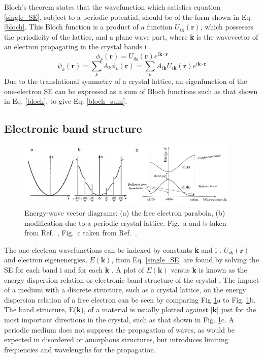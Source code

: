 \documentclass[11pt, twoside]{report}
\begin{document}
Bloch's theorem states that the wavefunction which satisfies equation \ref{single_SE}, subject to a periodic potential, should be of the form shown in Eq. \ref{bloch}. This Bloch function is a product of a function $U_{i\mathbf{k}}(\mathbf{r})$, which possesses the periodicity of the lattice, and a plane wave part, where \textbf{k} is the wavevector of an electron propagating in the crystal bands i \cite{Nelson3}.
\begin{equation} \label{bloch}
\phi_k(\mathbf{r}) = U_{i\mathbf{k}}(\mathbf{r}) e^{i\mathbf{k \cdot r}} 
\end{equation}
\begin{equation} \label{bloch_sum}
\psi_k(\mathbf{r}) = \sum_k A_k \phi_k(\mathbf{r}) = \sum_k A_{i\mathbf{k}}U_{i\mathbf{k}}(\mathbf{r}) e^{i\mathbf{k \cdot r}} 
\end{equation}
Due to the translational symmetry of a crystal lattice, an eigenfunction of the one-electron SE can be expressed as a sum of Bloch functions such as that shown in Eq. \ref{bloch}, to give Eq. \ref{bloch_sum}. 


\subsection{Electronic band structure}

\begin{figure}[h!]
  \centering
    \includegraphics[width=0.95\textwidth]{figures/bs1_2.png}
    \caption[Energy-wave vector diagrams: (a) the free electron parabola, (b) modification due to a periodic crystal lattice.]{Energy-wave vector diagrams: (a) the free electron parabola, (b) modification due to a periodic crystal lattice. Fig.~a and b taken from Ref.~, Fig.~c taken from Ref.~.}
  \label{bs1}
\end{figure}
The one-electron wavefunctions can be indexed by constants \textbf{k} and i \cite{fund_semi}. 
$U_{i\mathbf{k}}(\mathbf{r})$ and electron eigenenergies, $E(\mathbf{k})$, from Eq. \ref{single_SE} are found by solving the SE for each band i and for each \textbf{k} \cite{Nelson3}.
A plot of $E(\textbf{k})$ versus \textbf{k} is known as the energy dispersion relation or electronic band structure of the crystal \cite{fund_semi}.
The impact of a medium with a discrete structure, such as a crystal lattice, on the energy dispersion relation of a free electron can be seen by comparing Fig \ref{bs1}a to Fig. \ref{bs1}b.
The band structure, E(\textbf{k}), of a material is usually plotted against $|\textbf{k}|$ just for the most important directions in the crystal, such as that shown in Fig. \ref{bs1}c. A periodic medium does not suppress the propagation of waves, as would be expected in disordered or amorphous structures, but introduces limiting frequencies and wavelengths for the propagation. 
\end{document}
